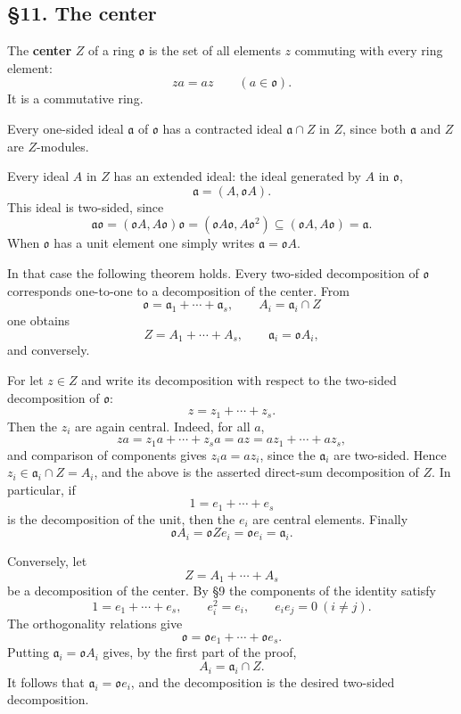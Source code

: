 \documentclass[11pt]{article}
\begin{document}
\subsection{§11. The center}\label{the-center}

The \textbf{center} \(Z\) of a ring \(\mathfrak{o}\) is the set of all
elements \(z\) commuting with every ring element: \[
  za=az\qquad(a\in\mathfrak{o}).
\] It is a commutative ring.

Every one-sided ideal \(\mathfrak a\) of \(\mathfrak{o}\) has a
contracted ideal \(\mathfrak a\cap Z\) in \(Z\), since both
\(\mathfrak a\) and \(Z\) are \(Z\)-modules.

Every ideal \(A\) in \(Z\) has an extended ideal: the ideal generated by
\(A\) in \(\mathfrak{o}\), \[
  \mathfrak a=(A,\mathfrak{o}A).
\] This ideal is two-sided, since \[
  \mathfrak a\mathfrak{o}=(\mathfrak{o}A,A\mathfrak{o})\mathfrak{o}
      = (\mathfrak{o}A\mathfrak{o},A\mathfrak{o}^2)
      \subseteq (\mathfrak{o}A,A\mathfrak{o})=\mathfrak a.
\] When \(\mathfrak{o}\) has a unit element one simply writes
\(\mathfrak a=\mathfrak{o}A\).

In that case the following theorem holds. Every two-sided decomposition
of \(\mathfrak{o}\) corresponds one-to-one to a decomposition of the
center. From \[
  \mathfrak{o}=\mathfrak a_1+\cdots+\mathfrak a_s,
  \qquad
  A_i=\mathfrak a_i\cap Z
\] one obtains \[
  Z=A_1+\cdots+A_s,
  \qquad
  \mathfrak a_i=\mathfrak{o}A_i,
\] and conversely.

For let \(z\in Z\) and write its decomposition with respect to the
two-sided decomposition of \(\mathfrak{o}\): \[
  z=z_1+\cdots+z_s.
\] Then the \(z_i\) are again central. Indeed, for all \(a\), \[
  za=z_1a+\cdots+z_sa=az=az_1+\cdots+az_s,
\] and comparison of components gives \(z_i a=a z_i\), since the
\(\mathfrak a_i\) are two-sided. Hence
\(z_i\in\mathfrak a_i\cap Z=A_i\), and the above is the asserted
direct-sum decomposition of \(Z\). In particular, if \[
  1=e_1+\cdots+e_s
\] is the decomposition of the unit, then the \(e_i\) are central
elements. Finally \[
  \mathfrak{o}A_i=\mathfrak{o}Ze_i=\mathfrak{o}e_i=\mathfrak a_i.
\]

Conversely, let \[
  Z=A_1+\cdots+A_s
\] be a decomposition of the center. By §9 the components of the
identity satisfy \[
  1=e_1+\cdots+e_s,
  \qquad e_i^2=e_i,
  \qquad e_ie_j=0\ (i\ne j).
\] The orthogonality relations give \[
  \mathfrak{o}=\mathfrak{o}e_1+\cdots+\mathfrak{o}e_s.
\] Putting \(\mathfrak a_i=\mathfrak{o}A_i\) gives, by the first part of
the proof, \[
  A_i=\mathfrak a_i\cap Z.
\] It follows that \(\mathfrak a_i=\mathfrak{o}e_i\), and the
decomposition is the desired two-sided decomposition.
\end{document}
